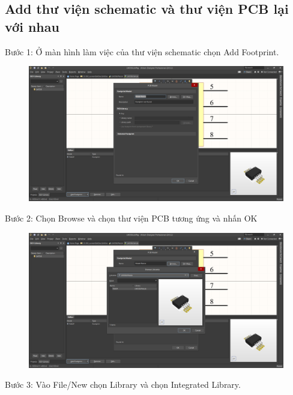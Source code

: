             \subsection{Add thư viện schematic và thư viện PCB lại với nhau}
                Bước 1: Ở màn hình làm việc của thư viện schematic chọn Add Footprint.
                \begin{figure}[H]
                    \centering
                    \includegraphics[width=1\textwidth]{pictures/ch3.12.png}
                \end{figure}
                Bước 2: Chọn Browse và chọn thư viện PCB tương ứng và nhấn OK
                \begin{figure}[H]
                    \centering
                    \includegraphics[width=1\textwidth]{pictures/ch3.13.png}
                \end{figure}
                \cleardoublepage
                Bước 3: Vào File/New chọn Library và chọn Integrated Library.
